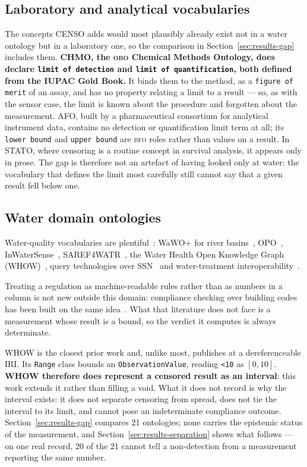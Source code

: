 \subsection{Laboratory and analytical vocabularies}
The concepts CENSO adds would most plausibly already exist not in a water
ontology but in a laboratory one, so the comparison in
Section~\ref{sec:results-gap} includes them. \textbf{CHMO, the \textsc{obo}
Chemical Methods Ontology, does declare \texttt{limit of detection} and
\texttt{limit of quantification}, both defined from the IUPAC Gold Book.} It
binds them to the method, as a \texttt{figure of merit} of an assay, and has no
property relating a limit to a result --- so, as with the sensor case, the limit
is known about the procedure and forgotten about the measurement. AFO, built by
a pharmaceutical consortium for analytical instrument data, contains no
detection or quantification limit term at all; its \texttt{lower bound} and
\texttt{upper bound} are \textsc{bfo} roles rather than values on a result. In
STATO, where censoring is a routine concept in survival analysis, it appears
only in prose. The gap is therefore not an artefact of having looked only at
water: the vocabulary that defines the limit most carefully still cannot say
that a given result fell below one.

\subsection{Water domain ontologies}
Water-quality vocabularies are plentiful~\cite{water_onto_review}: WaWO+ for
river basins~\cite{olivafelipe2017wawoplus}, OPO~\cite{wang2020opo},
InWaterSense~\cite{jajaga2015expert,ahmedi2013wqm},
SAREF4WATR~\cite{etsi2025saref4watr}, the Water Health Open Knowledge Graph
(WHOW)~\cite{whow2023onto,whokg2025}, query technologies over
SSN~\cite{calbimonte2012ssw} and water-treatment
interoperability~\cite{saka2026acquirium}.

Treating a regulation as machine-readable rules rather than as numbers in a
column is not new outside this domain: compliance checking over building codes
has been built on the same idea~\cite{bouzidi2012compliance}. What that
literature does not face is a measurement whose result is a bound, so the
verdict it computes is always determinate.

WHOW is the closest prior work and, unlike most, publishes at a dereferenceable
IRI. Its \texttt{Range} class bounds an \texttt{ObservationValue}, reading
\texttt{<10} as $[0,10]$. \textbf{WHOW therefore does represent a censored
result as an interval}: this work extends it rather than filling a void. What it
does not record is why the interval exists: it does not separate censoring from
spread, does not tie the interval to its limit, and cannot pose an indeterminate
compliance outcome. Section~\ref{sec:results-gap} compares \num{21} ontologies;
none carries the epistemic status of the measurement, and
Section~\ref{sec:results-separation} shows what follows --- on one real record,
\num{20} of the \num{21} cannot tell a non-detection from a measurement
reporting the same number.

